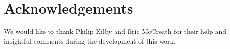 \section{Acknowledgements}
We would like to thank Philip Kilby and Eric McCreath for their help and insightful comments during the development of this work.

